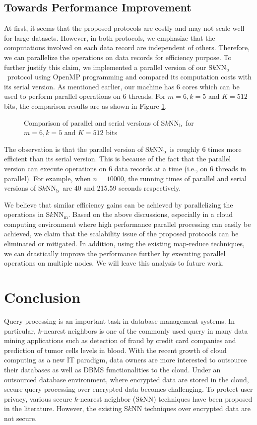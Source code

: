 \documentclass{article}
\newcommand{\sknnb}{S$k$NN$_\textrm{b}$}
\newcommand{\sknnm}{S$k$NN$_\textrm{m}$}
\begin{document}
\subsection{Towards Performance Improvement}
At first, it seems that the proposed protocols are costly and may 
not scale well for large datasets. However, in both protocols, we emphasize 
that the computations involved on each data record are 
independent of others. Therefore, we can parallelize the operations on data records for 
efficiency purpose. To 
further justify this claim, we implemented a 
parallel version of our \sknnb~protocol using OpenMP programming and compared its 
computation costs with its serial version. As mentioned earlier, our machine has 6 cores which can be used to 
perform parallel operations on 6 threads. For $m=6, k=5$ and $K=512$ bits, the comparison 
results are as shown in Figure \ref{fig:comp-with-parallel}. 
\begin{figure}
\centering
{}
\caption{Comparison of parallel and serial versions of \sknnb~for $m=6, k=5$ and $K=512$ bits}
\label{fig:comp-with-parallel}
\end{figure}
The observation is 
that the parallel version of \sknnb~is roughly 6 times more efficient than its serial version. This 
is because of the fact that the parallel version can execute operations on 6 data records at a time (i.e., 
on 6 threads in parallel). For example, when $n=10000$, the running times of 
parallel and serial versions of \sknnb~are 40 and 215.59 seconds respectively. 
 


We believe that similar efficiency gains can be achieved by parallelizing the operations in \sknnm. 
Based on the above discussions, especially in a cloud 
computing environment where high performance parallel processing can easily be 
achieved, we claim that the scalability issue of the proposed protocols can be eliminated or mitigated.
In addition, using the existing map-reduce techniques, we can drastically 
improve the performance further by executing parallel operations 
on multiple nodes. We will leave this analysis to future work. 

\section{Conclusion} \label{sec:concl}
Query processing is an important task in database management systems. In particular, 
$k$-nearest neighbors is one of the commonly used query in many data mining applications 
such as detection of fraud by credit card companies and prediction of tumor cells levels 
in blood. With the recent growth of cloud computing as a new IT paradigm, data owners are more 
interested to outsource their databases as well as DBMS functionalities to the cloud. Under an outsourced 
database environment, where encrypted data are stored in the cloud, secure query processing over 
encrypted data becomes challenging. To protect user privacy, various secure  
$k$-nearest neighbor (S$k$NN) techniques have been proposed in the literature. However, the existing 
S$k$NN techniques over encrypted data are not secure. 
\end{document}
